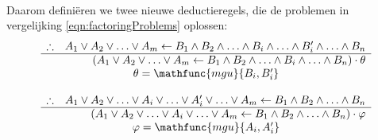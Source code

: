\paragraph{}
Daarom defini\"eren we twee nieuwe deductieregels, die de problemen in vergelijking \ref{eqn:factoringProblems} oplossen:
\begin{equation}
\begin{array}{lr}
\therefore&A_1\vee A_2\vee\ldots\vee A_m\leftarrow B_1\wedge B_2\wedge\ldots\wedge B_i\wedge\ldots\wedge B_i'\wedge\ldots\wedge B_n\\
\hline
&\left(A_1\vee A_2\vee\ldots\vee A_m\leftarrow B_1\wedge B_2\wedge\ldots\wedge B_i\wedge\ldots\wedge B_n\right)\cdot\theta\\
\multicolumn{2}{c}{\theta=\mathfunc{mgu}{B_i,B_i'}}\\\\

\therefore&A_1\vee A_2\vee\ldots\vee A_i\vee\ldots\vee A_i'\vee\ldots\vee A_m\leftarrow B_1\wedge B_2\wedge\ldots\wedge B_n\\
\hline
&\left(A_1\vee A_2\vee\ldots\vee A_i\vee\ldots\vee A_m\leftarrow B_1\wedge B_2\wedge\ldots\wedge B_n\right)\cdot\varphi\\
\multicolumn{2}{c}{\varphi=\mathfunc{mgu}{A_i,A_i'}}
\end{array}
\end{equation}
